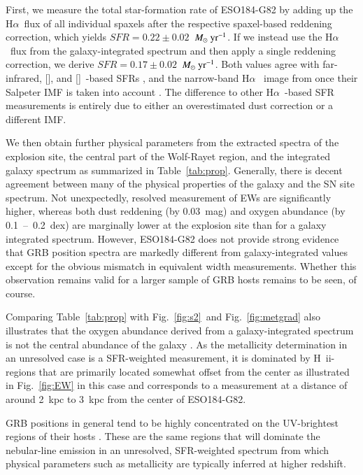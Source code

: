 \documentclass[traditabstract, referee]{aa}
\newcommand{\ha}{H$\alpha$}
\newcommand{\hii}{\mbox{H~{\sc ii}}}
\newcommand{\oi}{[\ion{O}{i}]}
\newcommand{\cii}{[\ion{C}{ii}]}
\newcommand{\Msunyr}{$M_\odot~\rm{yr}^{-1}$}
\begin{document}
First, we measure the total star-formation rate of ESO184-G82 by adding up the \ha~flux of all individual spaxels after the respective spaxel-based reddening correction, which yields $SFR=0.22\pm0.02$~\Msunyr. If we instead use the \ha~flux from the galaxy-integrated spectrum and then apply a single reddening correction, we derive $SFR=0.17\pm0.02$~\Msunyr. Both values agree with far-infrared, \oi, and \cii~-based SFRs \citep{2014A&A...562A..70M, 2016arXiv160901742M}, and the narrow-band \ha~ image from \citet{2005NewA...11..103S} once their Salpeter IMF is taken into account \citep[see also][]{2009ApJ...691..182S}. The difference to other \ha~-based SFR measurements \citep{2006A&A...454..103H, 2008A&A...490...45C} is entirely due to either an overestimated dust correction or a different IMF.

We then obtain further physical parameters from the extracted spectra of the explosion site, the central part of the Wolf-Rayet region, and the integrated galaxy spectrum as summarized in Table~\ref{tab:prop}. Generally, there is decent agreement between many of the physical properties of the galaxy and the SN site spectrum. Not unexpectedly, resolved measurement of EWs are significantly higher, whereas both dust reddening (by 0.03~mag) and oxygen abundance (by 0.1~--~0.2~dex) are marginally lower at the explosion site than for a galaxy integrated spectrum. However, ESO184-G82 does not provide strong evidence that GRB position spectra are markedly different from galaxy-integrated values except for the obvious mismatch in equivalent width measurements. Whether this observation remains valid for a larger sample of GRB hosts remains to be seen, of course.

Comparing Table~\ref{tab:prop} with Fig.~\ref{fig:s2}~and Fig.~\ref{fig:metgrad} also illustrates that the oxygen abundance derived from a galaxy-integrated spectrum is not the central abundance of the galaxy \citep[see also e.g.,][]{2016A&A...591A..48G}. As the metallicity determination in an unresolved case is a SFR-weighted measurement, it is dominated by \hii-regions that are primarily located somewhat offset from the center as illustrated in Fig.~\ref{fig:EW} in this case and corresponds to a measurement at a distance of around 2~kpc to 3~kpc from the center of ESO184-G82. 

{GRB positions in general tend to be highly concentrated on the UV-brightest regions of their hosts \citep[e.g.,][]{2010MNRAS.405...57S, 2016ApJ...817..144B, 2017MNRAS.tmp..220L}. These are the same regions that will dominate the nebular-line emission in an unresolved, SFR-weighted spectrum from which physical parameters such as metallicity are typically inferred at higher redshift.}
\end{document}
